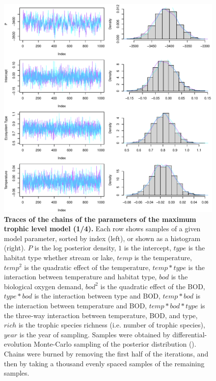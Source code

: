 \documentclass[11pt, oneside]{article}
\begin{document}
\begin{figure}[H]
\begin{center}
\includegraphics[page=1, width=1\linewidth]{scripts/b0_6_3/out_mTL/fig_tracePlot_beta.pdf}
\caption{
    \textbf{Traces of the chains of the parameters of the maximum trophic level model (1/4).}
    Each row shows samples of a given model parameter, sorted by index (left), or shown as a histogram (right).
    $P$ is the log posterior density, $1$ is the intercept, $type$ is the habitat type whether stream or lake, $temp$ is the temperature, $temp^2$ is the quadratic effect of the temperature, $temp * type$ is the interaction between temperature and habitat type, $bod$ is the biological oxygen demand, $bod^2$ is the quadratic effect of the BOD, $type * bod$ is the interaction between type and BOD, $temp * bod$ is the interaction between temperature and BOD, $temp * bod * type$ is the three-way interaction between temperature, BOD, and type, $rich$ is the trophic species richness (i.e. number of trophic species), $year$ is the year of sampling.
    Samples were obtained by differential-evolution Monte-Carlo sampling of the posterior distribution (\cite{TerBraak2006}).
    Chains were burned by removing the first half of the iterations, and then by taking a thousand evenly spaced samples of the remaining samples.
} 
\end{center}
\end{figure}
\end{document}
